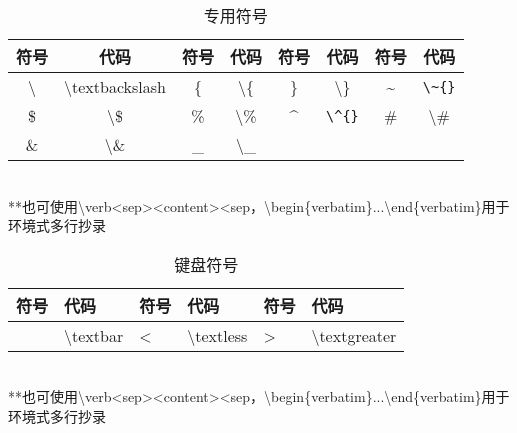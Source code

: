 \documentclass[UTF8,fontset=ubuntu]{ctexart}
\begin{document}
\begin{table}[H]
\begin{tabular}{c c c c c c c c}
	\hline
	符号 & 代码 & 符号 & 代码 & 符号 & 代码 & 符号 & 代码\\
	\hline
	\textbackslash & \textbackslash textbackslash & \{ & \textbackslash\{ & \} & \textbackslash\} & \~{} & \verb|\~{}|\\
	\$ & \textbackslash\$ & \% & \textbackslash\% & \^{} & \verb|\^{}| & \# & \textbackslash\#\\
	\& & \textbackslash\& & \_ & \textbackslash\_\\
	\hline
\end{tabular}\\[2mm]
\RaggedRight
**也可使用\textbackslash verb\textless sep\textgreater\textless content\textgreater\textless sep，\textbackslash begin\{verbatim\}...\textbackslash end\{verbatim\}用于环境式多行抄录\\
\caption{专用符号}
\end{table}
\begin{table}[H]
\begin{tabular}{l l l l l l}
	\hline
	符号 & 代码 & 符号 & 代码 & 符号 & 代码\\
	\hline
	\textbar & \textbackslash textbar & \textless & \textbackslash textless & \textgreater & \textbackslash textgreater\\
	\hline
\end{tabular}\\[2mm]
\RaggedRight
**也可使用\textbackslash verb\textless sep\textgreater\textless content\textgreater\textless sep，\textbackslash begin\{verbatim\}...\textbackslash end\{verbatim\}用于环境式多行抄录\\
\caption{键盘符号}
\end{table}
\end{document}
